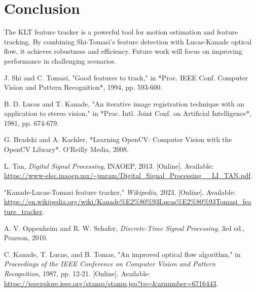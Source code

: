 \documentclass[10pt, conference, letterpaper]{IEEEtran}
\begin{document}
\section{Conclusion}
The KLT feature tracker is a powerful tool for motion estimation and feature tracking. By combining Shi-Tomasi's feature detection with Lucas-Kanade optical flow, it achieves robustness and efficiency. Future work will focus on improving performance in challenging scenarios.

\begin{thebibliography}{1}

J. Shi and C. Tomasi, "Good features to track," in *Proc. IEEE Conf. Computer Vision and Pattern Recognition*, 1994, pp. 593-600.

B. D. Lucas and T. Kanade, "An iterative image registration technique with an application to stereo vision," in *Proc. Intl. Joint Conf. on Artificial Intelligence*, 1981, pp. 674-679.

G. Bradski and A. Kaehler, *Learning OpenCV: Computer Vision with the OpenCV Library*. O'Reilly Media, 2008.

L. Tan, \textit{Digital Signal Processing}, INAOEP, 2013. [Online]. Available: \url{https://www-elec.inaoep.mx/~jmram/Digital_Signal_Processing__LI_TAN.pdf}.

"Kanade-Lucas-Tomasi feature tracker," \textit{Wikipedia}, 2023. [Online]. Available: \url{https://en.wikipedia.org/wiki/Kanade%E2%80%93Lucas%E2%80%93Tomasi_feature_tracker}.

A. V. Oppenheim and R. W. Schafer, \textit{Discrete-Time Signal Processing}, 3rd ed., Pearson, 2010.

C. Kanade, T. Lucas, and B. Tomas, "An improved optical flow algorithm," in \textit{Proceedings of the IEEE Conference on Computer Vision and Pattern Recognition}, 1987, pp. 12-21. [Online]. Available: \url{https://ieeexplore.ieee.org/stamp/stamp.jsp?tp=&arnumber=6716443}.

\end{thebibliography}
\end{document}
